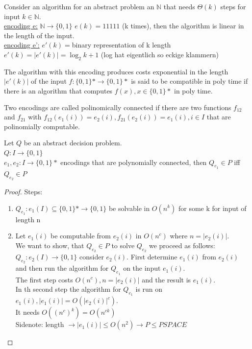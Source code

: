 \begin{example}
  Consider an algorithm for an abstract problem an $\mathbb{N}$ that needs $\Theta(k)$ steps for input $k \in \mathbb{N}$. \\
  \underline{encoding e:} $\mathbb{N} \rightarrow \{ 0,1 \}$ $e(k) = 11111$ (k times), then the algorithm is linear in the length of the input. \\
  \underline{encoding e':} $e'(k)=$binary representation of k length$e'(k) = \left| e'(k) \right| = \log_2 k +1$ (log hat eigentlich so eckige klammern)
\end{example}

The algorithm with this encoding produces costs exponential in the length $\left| e'(k) \right|$ of the input $f:\{ 0,1 \}* \rightarrow \{ 0,1 \}*$ is said to be compatible in poly time if there is an algorithm that computes $f(x), x \in \{ 0,1 \}*$ in poly time.

Two encodings are called polinomically connected if there are two functions $f_{12}$ and $f_{21}$ with $f_{12}(e_{1}(i)) = e_{2}(i), f_{21}(e_{2}(i)) = e_{1}(i), i \in I$ that are polinomially computable.\\

\begin{lemma}
  Let $Q$ be an abstract decision problem. \\
  $Q:I \rightarrow \{ 0,1 \}$ \\
  $e_{1},e_{2}:I \rightarrow \{ 0,1 \}*$ encodings that are polynomially connected, then $Q_{e_{1}} \in P$ iff $Q_{e_{2}} \in P$
\end{lemma}

\begin{proof}
  Steps:
  \begin{enumerate}
    \item $Q_{e_{1}}: e_{1}(I) \subseteq \{ 0,1 \}* \rightarrow \{ 0,1 \}$ be solvable in $O(n^k)$ for some k for input of length n
    \item Let $e_{1}(i)$ be computable from $e_{2}(i)$ in $O(n^c)$ where $n=\left| e_{2}(i) \right|$. \\
          We want to show, that $Q_{e_{2}} \in P$ to solve $Q_{e_{2}}$ we proceed as follows: \\
          $Q_{e_{2}}: e_{2}(I) \rightarrow \{ 0,1 \}$ consider $e_{2}(i)$. First determine $e_{1}(i)$ from $e_{2}(i)$ and then run the algorithm for $Q_{e_{1}}$ on the input $e_{1}(i)$.\\
          The first step costs $O(n^c), n= \left| e_{2}(i) \right|$ and the result is $e_{1}(i)$.\\
          In th second step the algorithm for $Q_{e_{1}}$ is run on $e_{1}(i), \left| e_{1}(i) \right| = O( \left| e_{2}(i) \right|^c)$. \\
          It needs $O((n^c)^k) = O(n^{ck})$ \\
          \newline
          Sidenote: length $\rightarrow \left| e_{1}(i) \right| \leq O(n^2) \rightarrow P \leq PSPACE$
  \end{enumerate}
\end{proof}

